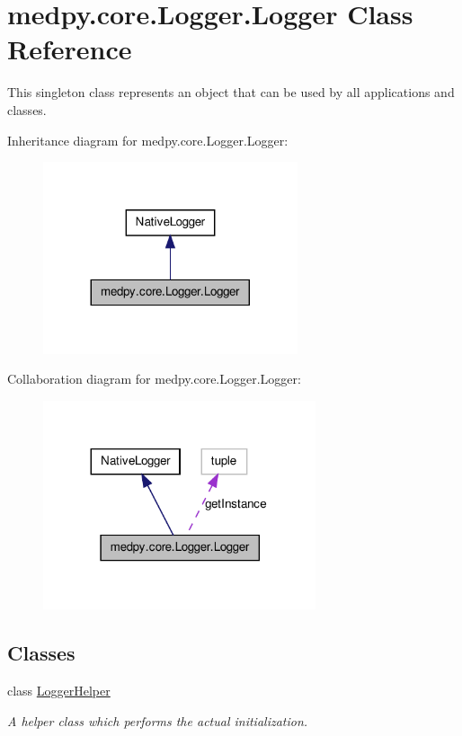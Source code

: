 \hypertarget{classmedpy_1_1core_1_1Logger_1_1Logger}{
\section{medpy.core.Logger.Logger Class Reference}
\label{classmedpy_1_1core_1_1Logger_1_1Logger}
}


This singleton class represents an object that can be used by all applications and classes.  




Inheritance diagram for medpy.core.Logger.Logger:\nopagebreak
\begin{figure}[H]
\begin{center}
\leavevmode
\includegraphics[width=212pt]{classmedpy_1_1core_1_1Logger_1_1Logger__inherit__graph}
\end{center}
\end{figure}


Collaboration diagram for medpy.core.Logger.Logger:\nopagebreak
\begin{figure}[H]
\begin{center}
\leavevmode
\includegraphics[width=227pt]{classmedpy_1_1core_1_1Logger_1_1Logger__coll__graph}
\end{center}
\end{figure}
\subsection*{Classes}
\begin{DoxyCompactItemize}
\item 
class \hyperlink{classmedpy_1_1core_1_1Logger_1_1Logger_1_1LoggerHelper}{LoggerHelper}
\begin{DoxyCompactList}\small\item\em A helper class which performs the actual initialization. \end{DoxyCompactList}\end{DoxyCompactItemize}
